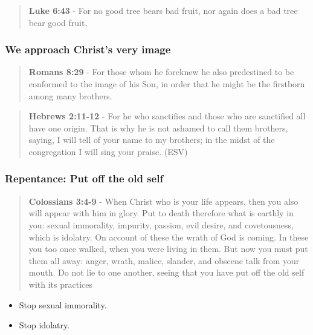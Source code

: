 \documentclass[11pt]{article}
\begin{document}
\begin{quote}
\textbf{Luke 6:43} - For no good tree bears bad fruit, nor again does a bad tree bear good fruit,
\end{quote}

\subsubsection{We approach Christ's very image}
\label{sec:org4b0df07}
\begin{quote}
\textbf{Romans 8:29} - For those whom he foreknew he also predestined to be conformed to the image of his Son, in order that he might be the firstborn among many brothers.
\end{quote}

\begin{quote}
\textbf{Hebrews 2:11-12} -  For he who sanctifies and those who are sanctified all have one origin.  That is why he is not ashamed to call them brothers, saying, I will tell of your name to my brothers; in the midst of the congregation I will sing your praise.  (ESV)
\end{quote}

\subsubsection{Repentance: Put off the old self}
\label{sec:orgad40c1c}
\begin{quote}
\textbf{Colossians 3:4-9} - When Christ who is your life appears, then you also will appear with him in glory. Put to death therefore what is earthly in you: sexual immorality, impurity, passion, evil desire, and covetousness, which is idolatry. On account of these the wrath of God is coming. In these you too once walked, when you were living in them. But now you must put them all away: anger, wrath, malice, slander, and obscene talk from your mouth. Do not lie to one another, seeing that you have put off the old self with its practices
\end{quote}

\begin{itemize}
\item Stop sexual immorality.
\item Stop idolatry.
\end{itemize}
\end{document}
